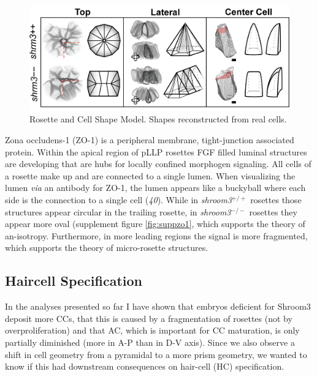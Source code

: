\documentclass[10pt, b5paper, singlespacinge, twoside]{reedthesis} %
\theoremstyle{definition}
\theoremstyle{definition}
\theoremstyle{definition}
\theoremstyle{remark}
\begin{document}
\begin{figure}

{\centering \includegraphics[width=0.9\linewidth]{figures/summary/cell-model} 

}

\caption[Rosette and Cell Shape Model]{Rosette and Cell Shape Model. Shapes reconstructed from real cells.}\label{fig:sumcells}
\end{figure}
Zona occludens-1 (ZO-1) is a peripheral membrane, tight-junction associated protein. Within the apical region of pLLP rosettes FGF filled luminal structures are developing that are hubs for locally confined morphogen signaling. All cells of a rosette make up and are connected to a single lumen. When visualizing the lumen \emph{via} an antibody for ZO-1, the lumen appears like a buckyball where each side is the connection to a single cell (\emph{40}). While in \emph{shroom3}\(^{+/+}\) rosettes those structures appear circular in the trailing rosette, in \emph{shroom3}\(^{-/-}\) rosettes they appear more oval (supplement figure \ref{fig:suppzo1}, which supports the theory of an-isotropy. Furthermore, in more leading regions the signal is more fragmented, which supports the theory of micro-rosette structures.

\hypertarget{res-hc}{%
\subsection{Haircell Specification}\label{res-hc}}

In the analyses presented so far I have shown that embryos deficient for Shroom3 deposit more CCs, that this is caused by a fragmentation of rosettes (not by overproliferation) and that AC, which is important for CC maturation, is only partially diminished (more in A-P than in D-V axis). Since we also observe a shift in cell geometry from a pyramidal to a more prism geometry, we wanted to know if this had downstream consequences on hair-cell (HC) specification.
\end{document}
